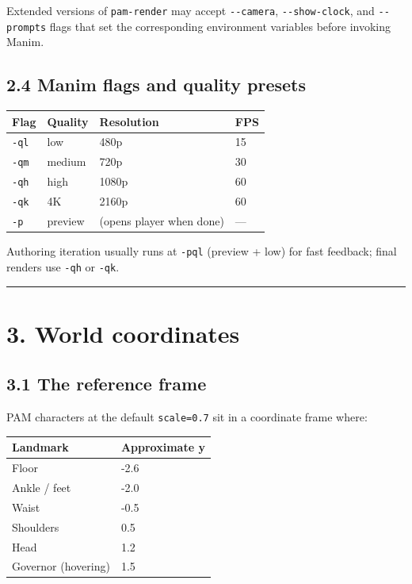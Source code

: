\documentclass[
  12pt,
  letterpaper,
]{book}
\begin{document}
Extended versions of \texttt{pam-render} may accept \texttt{-\/-camera},
\texttt{-\/-show-clock}, and \texttt{-\/-prompts} flags that set the
corresponding environment variables before invoking Manim.

\subsection{2.4 Manim flags and quality
presets}\label{manim-flags-and-quality-presets}

\begin{longtable}[]{@{}llll@{}}
\toprule\noalign{}
Flag & Quality & Resolution & FPS \\
\midrule\noalign{}
\endhead
\bottomrule\noalign{}
\endlastfoot
\texttt{-ql} & low & 480p & 15 \\
\texttt{-qm} & medium & 720p & 30 \\
\texttt{-qh} & high & 1080p & 60 \\
\texttt{-qk} & 4K & 2160p & 60 \\
\texttt{-p} & preview & (opens player when done) & --- \\
\end{longtable}

Authoring iteration usually runs at \texttt{-pql} (preview + low) for
fast feedback; final renders use \texttt{-qh} or \texttt{-qk}.

\begin{center}\rule{0.5\linewidth}{0.5pt}\end{center}

\section{3. World coordinates}\label{world-coordinates}

\subsection{3.1 The reference frame}\label{the-reference-frame}

PAM characters at the default \texttt{scale=0.7} sit in a coordinate
frame where:

\begin{longtable}[]{@{}ll@{}}
\toprule\noalign{}
Landmark & Approximate y \\
\midrule\noalign{}
\endhead
\bottomrule\noalign{}
\endlastfoot
Floor & -2.6 \\
Ankle / feet & -2.0 \\
Waist & -0.5 \\
Shoulders & 0.5 \\
Head & 1.2 \\
Governor (hovering) & 1.5 \\
\end{longtable}
\end{document}
